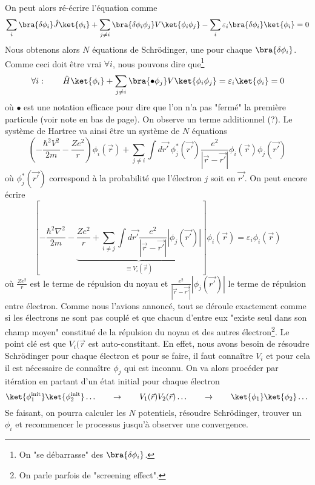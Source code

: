 On peut alors ré-écrire l'équation comme
\begin{equation}
\sum_i \bra{\delta \phi_i}\hat{J}\ket{\phi_i} + \sum_{j\neq i} \bra{\delta\phi_i\phi_j}V\ket{\phi_i\phi_j} - 
\sum_i\varepsilon_i\bra{\delta \phi_i}\ket{\phi_i} = 0
\end{equation}
Nous obtenons alors $N$ équations de Schrödinger, une pour chaque $\bra{\delta\phi_i}$. Comme ceci doit être vrai 
$\forall i$, nous pouvons dire que\footnote{On "se débarrasse" des $\bra{\delta\phi_i}$.}
\begin{equation}
\forall i :\qquad \hat{H}\ket{\phi_i} + \sum_{j\neq i} \bra{\bullet \phi_j}V\ket{\phi_i\phi_j} = \varepsilon_i\ket{\phi_i}=0
\end{equation}
où $\bullet$ est une notation efficace pour dire que l'on  n'a pas "fermé" la première particule (voir note en 
bas de page). On observe un terme additionnel (?). Le système de Hartree va ainsi être un système de $N$ équations
\begin{equation}
\left(-\frac{\hbar^2V^2}{2m}-\frac{Ze^2}{r}\right)\phi_i(\vec{r}) + \sum_{j\neq i} \int d\vec{r'}\ \phi_j^*(\vec{r'})\frac{e^2}{|\vec{r}-\vec{r'}|}\phi_i(\vec{r})\phi_j(\vec{r'})
\end{equation}
où $\phi_j^*(\vec{r'})$ correspond à la probabilité que l'électron $j$ soit en $\vec{r'}$. On peut encore écrire
\begin{equation}
\left[-\frac{\hbar^2\nabla^2}{2m}-\underbrace{\frac{Ze^2}{r}+\sum_{i\neq j}\int d\vec{r'}\frac{e^2}{|\vec{r}-
\vec{r'}|}|\phi_j(\vec{r'})|}_{\equiv V_i(\vec r)}\right]\phi_i(\vec{r})=\varepsilon_i\phi_i(\vec{r})
\end{equation}
où $\frac{Ze^2}{r}$ est le terme de répulsion du noyau et $\frac{e^2}{|\vec{r}-
\vec{r'}|}|\phi_j(\vec{r'})|$ le terme de répulsion entre électron. Comme nous l'avions annoncé, tout se 
déroule exactement comme si les électrons ne sont pas couplé et que chacun d'entre eux "existe seul dans son champ 
moyen" constitué de la répulsion du noyau et des autres électron\footnote{On parle parfois de "screening effect".}. Le point clé est que $V_i(\vec{r}$ est auto-constitant. En effet, nous avons besoin de résoudre Schrödinger pour chaque électron et pour se faire, il faut connaître $V_i$ et pour cela il est nécessaire de connaître $\phi_j$ qui est inconnu. On va alors procéder par itération en partant d'un état initial pour chaque électron
\begin{equation}
\ket{\phi_1^{\text{init}}}\ket{\phi_2^{\text{init}}}\dots\qquad\rightarrow\qquad V_1(\vec{r})V_2(\vec{r})\dots\qquad\rightarrow\qquad \ket{\phi_1}\ket{\phi_2}\dots
\end{equation}
Se faisant, on pourra calculer les $N$ potentiels, résoudre Schrödinger, trouver un $\phi_i$ et recommencer le processus jusqu'à observer une convergence.\\

